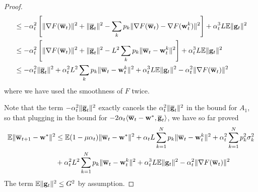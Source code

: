 \begin{proof}
\begin{align*}
	& \leq-\alpha_{t}^{2}\left[\|\nabla F({\overline{\mathbf{w}}}_{t})\|^{2}+\|{\overline{\mathbf{g}}}_{t}\|^{2}-\sum_{k}p_{k}\|\nabla F({\overline{\mathbf{w}}}_{t})-\nabla F({\mathbf{w}}_{t}^{k})\|^{2}\right]+\alpha_{t}^{3}L\mathbb{E}\|{\mathbf{g}}_{t}\|^{2}\\
	& \leq-\alpha_{t}^{2}\left[\|\nabla F({\overline{\mathbf{w}}}_{t})\|^{2}+\|{\overline{\mathbf{g}}}_{t}\|^{2}-L^{2}\sum_{k}p_{k}\|{\overline{\mathbf{w}}}_{t}-{\mathbf{w}}_{t}^{k}\|^{2}\right]+\alpha_{t}^{3}L\mathbb{E}\|{\mathbf{g}}_{t}\|^{2}\\
	& \leq-\alpha_{t}^{2}\|{\overline{\mathbf{g}}}_{t}\|^{2}+\alpha_{t}^{2}L^{2}\sum_{k}p_{k}\|{\overline{\mathbf{w}}}_{t}-{\mathbf{w}}_{t}^{k}\|^{2}+\alpha_{t}^{3}L\mathbb{E}\|{\mathbf{g}}_{t}\|^{2}-\alpha_{t}^{2}\|\nabla F({\overline{\mathbf{w}}}_{t})\|^{2}
	\end{align*}
	where we have used the smoothness of $F$ twice. 
	
	Note that the term $-\alpha_{t}^{2}\|{\overline{\mathbf{g}}}_{t}\|^{2}$ exactly
	cancels the $\alpha_{t}^{2}\|{\overline{\mathbf{g}}}_{t}\|^{2}$ in the bound
	for $A_{1}$, so that plugging in the bound for $-2\alpha_{t}\langle{\overline{\mathbf{w}}}_{t}-{\mathbf{w}}^{\ast},{\overline{\mathbf{g}}}_{t}\rangle$,
	we have so far proved 
	\begin{align*}
	\mathbb{E}\|{\overline{\mathbf{w}}}_{t+1}-{\mathbf{w}}^{\ast}\|^{2} & \leq\mathbb{E}(1-\mu\alpha_{t})\|{\overline{\mathbf{w}}}_{t}-{\mathbf{w}}^{\ast}\|^{2}+\alpha_{t}L\sum_{k=1}^{N}p_{k}\|{\overline{\mathbf{w}}}_{t}-{\mathbf{w}}_{t}^{k}\|^{2}+\alpha_{t}^{2}\sum_{k=1}^{N}p_{k}^{2}\sigma_{k}^{2}\\
	& +\alpha_{t}^{2}L^{2}\sum_{k=1}^{N}p_{k}\|{\overline{\mathbf{w}}}_{t}-{\mathbf{w}}_{t}^{k}\|^{2}+\alpha_{t}^{3}L\mathbb{E}\|{\mathbf{g}}_{t}\|^{2}-\alpha_{t}^{2}\|\nabla F({\overline{\mathbf{w}}}_{t})\|^{2}
	\end{align*}
	The term $\mathbb{E}\|{\mathbf{g}}_{t}\|^{2}\leq G^{2}$ by assumption. 
	

\end{proof}

